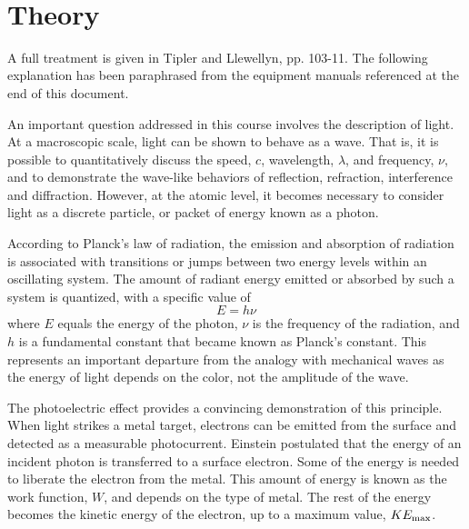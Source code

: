 \documentclass{tufte-handout}
\begin{document}



\vspace{0.5cm}
\\
\vspace{0.5cm}

\section{Theory}


A full treatment is given in Tipler and Llewellyn, pp. 103-11.  The following explanation has been paraphrased from the equipment manuals referenced at the end of this document.

An important question addressed in this course involves the description of light.   At a macroscopic scale, light can be shown to behave as a wave.  That is, it is possible to quantitatively discuss the speed, $c$, wavelength, $\lambda$, and frequency, $\nu$, and to demonstrate the wave-like behaviors of reflection, refraction, interference and diffraction.  However, at the atomic level, it becomes necessary to consider light as a discrete particle, or packet of energy known as a photon.    

According to Planck's law of radiation, the emission and absorption of radiation is associated with transitions or jumps between two energy levels within an oscillating system.   The amount of radiant energy emitted or absorbed by such a system is quantized, with a specific value of 
\begin{equation} 
E = h \nu
\end{equation}
where $E$ equals the energy of the photon, $\nu$ is the frequency of the radiation, and $h$ is a fundamental constant that became known as Planck's constant.  This represents an important departure from the analogy with mechanical waves as the energy of light depends on the color, not the amplitude of the wave.   

The photoelectric effect provides a convincing demonstration of this principle.   When light strikes a metal target, electrons can be emitted from the surface and detected as a measurable photocurrent.    Einstein postulated that the energy of an incident photon is transferred to a surface electron.  Some of the energy is needed to liberate the electron from the metal.   This amount of energy is known as the work function, $W$, and depends on the type of metal.   The rest of the energy becomes the kinetic energy of the electron, up to a maximum value, $KE_{\rm max}$.    
\end{document}
